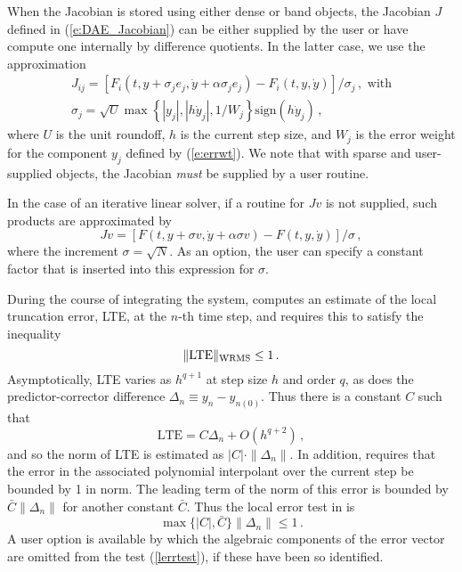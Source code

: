 When the Jacobian is stored using either dense or band {\sunmatrix}
objects, the Jacobian $J$ defined in (\ref{e:DAE_Jacobian}) 
can be either supplied by the user or have {\ida} compute one internally 
by difference quotients. In the latter case, we use the approximation
\begin{gather*}
  J_{ij} = [F_i(t,y+\sigma_j e_j,\dot{y}+\alpha\sigma_j e_j) - 
            F_i(t,y,\dot{y})]/\sigma_j \, , \text{ with}\\
  \sigma_j = \sqrt{U} \max \left\{ |y_j|, |h\dot{y}_j|,1/W_j \right\}
             \mbox{sign}(h \dot{y}_j) \, ,
\end{gather*}
where $U$ is the unit roundoff, $h$ is the current step size, and $W_j$ is 
the error weight for the component $y_j$ defined by (\ref{e:errwt}).
We note that with sparse and user-supplied {\sunmatrix} objects, the
Jacobian \emph{must} be supplied by a user routine.

In the case of an iterative linear solver, if a routine for $Jv$ is not
supplied, such products are approximated by
\begin{equation*}
Jv = [F(t,y+\sigma v,\dot{y}+\alpha\sigma v) - F(t,y,\dot{y})]/\sigma \, ,
\end{equation*}
where the increment $\sigma = \sqrt{N}$.  As an option, the user can
specify a constant factor that is inserted into this expression for $\sigma$.

During the course of integrating the system, {\ida} computes an estimate
of the local truncation error, LTE, at the $n$-th time step, and
requires this to satisfy the inequality
\begin{equation*}
  \| \mbox{LTE} \|_{\mbox{\scriptsize WRMS}} \leq 1 \, .               
\end{equation*}
Asymptotically, LTE varies as $h^{q+1}$ at step size $h$ and order $q$, as
does the predictor-corrector difference $\Delta_n \equiv y_n-y_{n(0)}$.  
Thus there is a constant $C$ such that
\[ \mbox{LTE} = C \Delta_n + O(h^{q+2}) \, , \]
and so the norm of LTE is estimated as $|C| \cdot \|\Delta_n\|$.
In addition, {\ida} requires that the error in the associated polynomial
interpolant over the current step be bounded by 1 in norm.  The
leading term of the norm of this error is bounded by
$\bar{C} \|\Delta_n\|$ for another constant $\bar{C}$.  Thus the local
error test in {\ida} is
\begin{equation}\label{lerrtest}
   \max\{ |C|, \bar{C} \} \|\Delta_n\| \leq 1 \, .
\end{equation}
A user option is available by which the algebraic components of the
error vector are omitted from the test (\ref{lerrtest}), if these have
been so identified.

